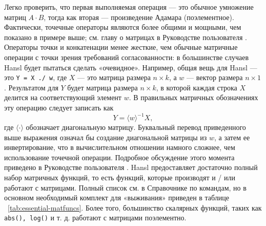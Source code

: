 Легко проверить, что первая выполняемая операция --- это обычное
умножение матриц $A \cdot B$, тогда как вторая --- произведение Адамара
(поэлементное). Фактически, точечные операторы являются более общими и
мощными, чем показано в примере выше; см. главу о матрицах в
Руководстве пользователя \GUG{}.  Операторы точки и конкатенации менее
жесткие, чем обычные матричные операции с точки зрения требований
согласованности: в большинстве случаев Hansl будет пытаться сделать
«очевидное». Например, общая вещь для Hansl --- это \texttt{Y = X ./ w},
где $X$ --- это матрица размера $n \times k$, а $w$ --- вектор размера
$n \times 1$. Результатом для $Y$ будет матрица размера $n \times k$,
в которой каждая строка $X$ делится на соответствующий элемент $w$.  В
правильных матричных обозначениях эту операцию следует записать как
\[
  Y = \langle w \rangle^{-1} X,
\]
где $\langle \cdot \rangle$ обозначает диагональную
матрицу. Буквальный перевод приведенного выше выражения означал бы
создание диагональной матрицы из $w$, а затем ее инвертирование, что в
вычислительном отношении намного сложнее, чем использование точечной
операции. Подробное обсуждение этого момента приведено в Руководстве
пользователя \GUG.  Hansl предоставляет достаточно полный набор
матричных функций, то есть функций, которые производят и / или
работают с матрицами. Полный список см. в Справочнике по командам, но
в основном необходимый комплект для «выживания» приведен в таблице
~\ref{tab:essential-matfuncs}. Более того, большинство скалярных
функций, таких как \texttt{abs(), log()} и т. д. работают с матрицами
поэлементно.

